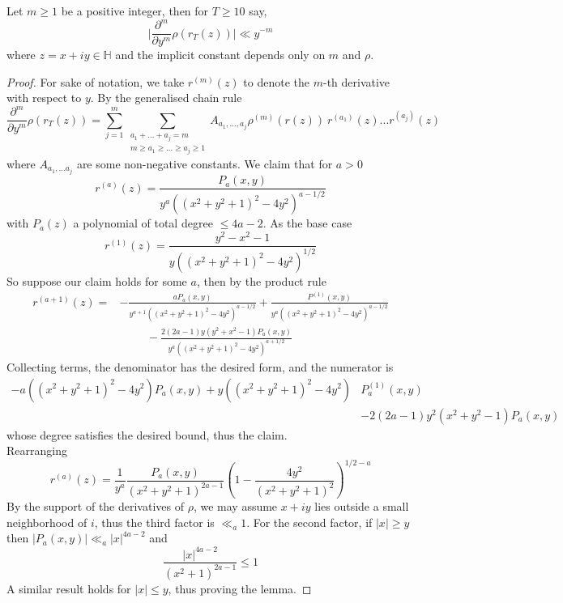 \documentclass[10pt,a4paper]{amsart}
\begin{document}
\begin{lemma}\label{lemma:derivativebound}
    Let $m\geq 1$ be a positive integer, then for $T\geq 10$ say,
    \begin{equation}\Bigr|\frac{\partial^m}{\partial y^m}\rho(r_T(z))\Bigr|\ll y^{-m}
    \end{equation}
    where $z=x+iy \in\mathbb{H} $ and the implicit constant depends only on $m$ and $\rho$.
\end{lemma}

\begin{proof}
    For sake of notation, we take $r^{(m)}(z)$ to denote the $m$-th derivative with respect to $y$. By the generalised chain rule 
    $$\frac{\partial^m}{\partial y^m}\rho(r_T(z))=\sum_{j=1}^{m}\sum_{\substack{a_1+...+a_j=m \\m\geq a_1\geq ... \geq a_j \geq 1 }}A_{a_1,...,a_j}\rho^{(m)}(r(z))\ r^{(a_1)}(z)...r^{(a_j)}(z)$$
    where $A_{a_1,...a_j}$ are some non-negative constants. We claim that for $a>0$
    $$r^{(a)}(z)=\frac{P_a(x,y)}{y^a((x^2+y^2+1)^2-4y^2)^{a-1/2}}$$
    with $P_a(z)$ a polynomial of total degree $\leq 4a-2$.
    As the base case
    $$r^{(1)}(z)=\frac{y^2-x^2-1}{y((x^2+y^2+1)^2-4y^2)^{1/2}}$$
    So suppose our claim holds for some $a$, then by the product rule
    \begin{align*}
            r^{(a+1)}(z)  = & -\frac{aP_a(x,y)}{y^{a+1}((x^2+y^2+1)^2-4y^2)^{a-1/2}}+\frac{P^{(1)}(x,y)}{y^{a}((x^2+y^2+1)^2-4y^2)^{a-1/2}} \\
            & \hspace{1cm} -\frac{2(2a-1)y(y^2+x^2-1)P_a(x,y)}{y^a((x^2+y^2+1)^2-4y^2)^{a+1/2}}
    \end{align*}
    Collecting terms, the denominator has the desired form, and the numerator is
    \begin{align*}
        -a((x^2+y^2+1)^2-4y^2)P_{a}(x,y)+y((x^2+y^2+1)^2-4y^2)& P_a^{(1)}(x,y) \\ 
        & -2(2a-1)y^2(x^2+y^2-1)P_a(x,y)
    \end{align*}
    whose degree satisfies the desired bound, thus the claim.\\
    Rearranging
    $$r^{(a)}(z)=\frac{1}{y^a}\frac{P_a(x,y)}{(x^2+y^2+1)^{2a-1}}\left(1-\frac{4y^2}{(x^2+y^2+1)^2}\right)^{1/2-a}$$
    By the support of the derivatives of $\rho$, we may assume $x+iy$ lies outside a small neighborhood of $i$, thus the third factor is $\ll_a 1$. For the second factor, if $|x|\geq y$ then $|P_a(x,y)|\ll_a |x|^{4a-2}$ and 
    $$\frac{|x|^{4a-2}}{(x^2+1)^{2a-1}}\leq 1$$
    A similar result holds for $|x| \leq y$, thus proving the lemma.
\end{proof}
\end{document}
